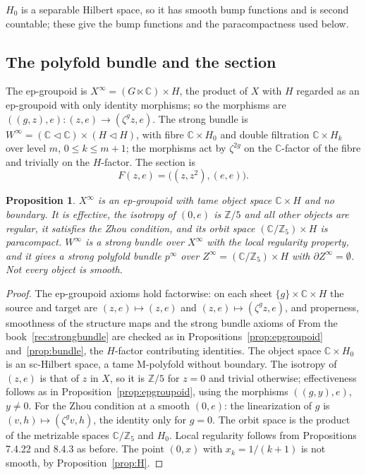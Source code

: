 \documentclass[11pt,a4paper]{article}
\theoremstyle{plain}
\newtheorem{proposition}[theorem]{Proposition}
\theoremstyle{definition}
\theoremstyle{remark}
\newcommand{\C}{\mathbb{C}}
\newcommand{\Z}{\mathbb{Z}}
\newcommand{\ZZ}{\Z/5}
\begin{document}
$H_0$ is a separable Hilbert space, so it has smooth bump functions and is second countable; these give
the bump functions and the paracompactness used below.

\subsection{The polyfold bundle and the section}

The ep-groupoid is $X^\infty=(G\ltimes\C)\times H$, the product of $X$ with $H$ regarded as an
ep-groupoid with only identity morphisms; so the morphisms are $((g,z),e)\colon(z,e)\to(\zeta^gz,e)$. The
strong bundle is $W^\infty=(\C\triangleleft\C)\times(H\triangleleft H)$, with fibre $\C\times H_0$ and
double filtration $\C\times H_k$ over level $m$, $0\le k\le m+1$; the morphisms act by $\zeta^{2g}$ on
the $\C$-factor of the fibre and trivially on the $H$-factor. The section is
\[
  F(z,e)=\bigl((z,z^2),(e,e)\bigr).
\]

\begin{proposition}\label{prop:infbundle}
$X^\infty$ is an ep-groupoid with tame object space $\C\times H$ and no boundary. It is effective, the
isotropy of $(0,e)$ is $\ZZ$ and all other objects are regular, it satisfies the Zhou condition, and its
orbit space $(\C/\Z_5)\times H$ is paracompact. $W^\infty$ is a strong bundle over $X^\infty$ with the
local regularity property, and it gives a strong polyfold bundle $p^\infty$ over
$Z^\infty=(\C/\Z_5)\times H$ with $\partial Z^\infty=\emptyset$. Not every object is smooth.
\end{proposition}

\begin{proof}
The ep-groupoid axioms hold factorwise: on each sheet $\{g\}\times\C\times H$ the source and target are
$(z,e)\mapsto(z,e)$ and $(z,e)\mapsto(\zeta^gz,e)$, and properness, smoothness of the structure maps
and the strong bundle axioms of From the book~\ref{rec:strongbundle} are checked as in
Propositions~\ref{prop:epgroupoid} and~\ref{prop:bundle}, the $H$-factor contributing identities. The
object space $\C\times H_0$ is an sc-Hilbert space, a tame M-polyfold without boundary. The isotropy of
$(z,e)$ is that of $z$ in $X$, so it is $\ZZ$ for $z=0$ and trivial otherwise; effectiveness follows as
in Proposition~\ref{prop:epgroupoid}, using the morphisms $((g,y),e)$, $y\neq0$. For the Zhou condition
at a smooth $(0,e)$: the linearization of $g$ is $(v,h)\mapsto(\zeta^gv,h)$, the identity only for
$g=0$. The orbit space is the product of the metrizable spaces $\C/\Z_5$ and $H_0$. Local regularity
follows from Propositions 7.4.22 and 8.4.3 as before. The point $(0,x)$ with $x_k=1/(k+1)$ is not
smooth, by Proposition~\ref{prop:H}.
\end{proof}
\end{document}
